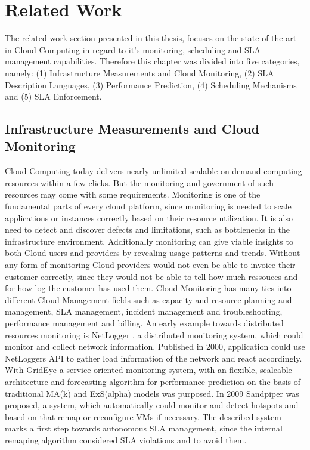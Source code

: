 
\chapter{Related Work} %
\label{Related Work} %
The related work section presented in this thesis, focuses on the state of the art in Cloud Computing in regard to it's monitoring, scheduling and SLA management capabilities. Therefore this chapter was divided into five categories, namely: (1) Infrastructure Measurements and Cloud Monitoring, (2) SLA Description Languages, (3) Performance Prediction, (4) Scheduling Mechanisms and (5) SLA Enforcement.

\section{Infrastructure Measurements and Cloud Monitoring}
Cloud Computing today delivers nearly unlimited scalable on demand computing resources within a few clicks. But the monitoring and government of such resources may come with some requirements. Monitoring is one of the fundamental parts of every cloud platform, since monitoring is needed to scale applications or instances correctly based on their resource utilization. It is also need to detect and discover defects and limitations, such as bottlenecks in the infrastructure environment. Additionally monitoring can give viable insights to both Cloud users and providers by revealing usage patterns and trends. Without any form of monitoring Cloud providers would not even be able to invoice their customer correctly, since they would not be able to tell how much ressouces and for how log the customer has used them. Cloud Monitoring has many ties into different Cloud Management fields such as capacity and resource planning and management, SLA management, incident management and troubleshooting, performance management and billing. An early example towards distributed resources monitoring is NetLogger \cite{DBLP:conf/mascots/2000}, a distributed monitoring system, which could monitor and collect network information. Published in 2000, application could use NetLoggers API to gather load information of the network and react accordingly. With GridEye \cite{Fu:2006:GSG:1170138.1170724} a service-oriented monitoring system, with an flexible, scaleable architecture and forecasting algorithm for performance prediction on the basis of traditional MA(k) and ExS(alpha) models was purposed. In 2009 Sandpiper \cite{Wood:2009:SBG:1663647.1663710} was proposed, a system, which automatically could monitor and detect hotspots and based on that remap or reconfigure VMs if necessary. The described system marks a first step towards autonomous SLA management, since the internal remaping algorithm considered SLA violations and to avoid them. 
